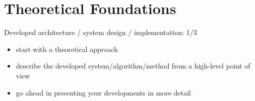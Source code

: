 
\chapter{Theoretical Foundations}%
\label{sec:related_work}

Developed architecture / system design / implementation: 1/3

\begin{itemize}
    \item start with a theoretical approach
    \item describe the developed system/algorithm/method from a high-level point of view
    \item go ahead in presenting your developments in more detail
\end{itemize}
